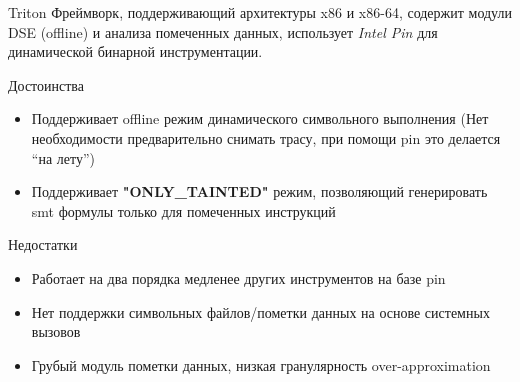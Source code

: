 \documentclass[10pt]{beamer}
\begin{document}
\begin{frame}{Triton}
    Фреймворк, поддерживающий архитектуры x86 и x86-64, содержит модули DSE (offline) и анализа помеченных данных, использует \emph{Intel Pin} для динамической бинарной инструментации.
    \begin{block}{Достоинства}
        \begin{itemize}
        \item Поддерживает offline режим динамического символьного выполнения (Нет необходимости предварительно снимать трасу, при помощи pin это делается ``на лету'')
        \item Поддерживает \textbf{"ONLY\_TAINTED"} режим, позволяющий генерировать smt формулы только для помеченных инструкций
        \end{itemize}
    \end{block}

      \begin{block}{Недостатки}
          \begin{itemize}
      \item Работает на два порядка медленее других инструментов на базе pin
      \item Нет поддержки символьных файлов/пометки данных на основе системных вызовов
      \item Грубый модуль пометки данных, низкая гранулярность over-approximation
      \end{itemize}
    \end{block}

\end{frame}

\end{document}
